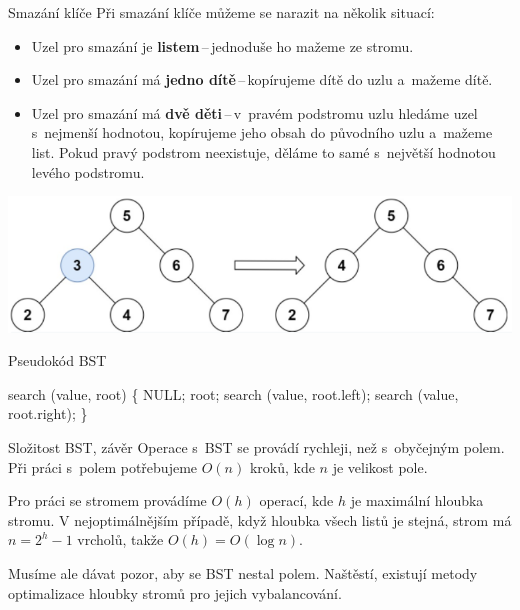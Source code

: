 \documentclass[10pt]{beamer}
\begin{document}
\begin{frame}[t]{Smazání klíče}
    Při smazání klíče můžeme se narazit na několik situací:
    \begin{itemize}
        \item Uzel pro smazání je \textbf{listem}\,--\,jednoduše ho mažeme ze stromu.
        \item Uzel pro smazání má \textbf{jedno dítě}\,--\,kopírujeme dítě do uzlu a~mažeme dítě.
        \item Uzel pro smazání má \textbf{dvě děti}\,--\,v~pravém podstromu uzlu hledáme uzel s~nejmenší hodnotou, kopírujeme jeho obsah do původního uzlu a~mažeme list. Pokud pravý podstrom neexistuje, děláme to samé s~největší hodnotou levého podstromu.
    \end{itemize}
    \medskip
    \begin{center}
        \includegraphics[scale=0.53]{mazani.png}
    \end{center}
\end{frame}

\begin{frame}[fragile]{Pseudokód BST}
    \begin{algorithm}[H]
    \begin{algorithmic}[1]
    \STATE search (value, root) \{
            \RETURN NULL;
            \RETURN root;
            \RETURN search (value, root.left);
        \ELSE
            \RETURN search (value, root.right);
        \ENDIF
    \STATE \}
    \end{algorithmic}
    \caption{Pseudokód pro vyhledávání klíče v~BST}
    \label{alg:seq}
    \end{algorithm}
\end{frame}

\begin{frame}{Složitost BST, závěr}
    Operace s~BST se provádí rychleji, než s~obyčejným polem. Při práci s~polem potřebujeme $O(n)$ kroků, kde $n$ je velikost pole.
    
    Pro práci se stromem provádíme $O(h)$ operací, kde $h$ je maximální hloubka stromu. V nejoptimálnějším případě, když hloubka všech listů je stejná, strom má $n=2^{h}-1$ vrcholů, takže $O(h)=O(\log n)$. 
    
    Musíme ale dávat pozor, aby se BST nestal polem. Naštěstí, existují metody optimalizace hloubky stromů pro jejich vybalancování.  
\end{frame}
\end{document}
